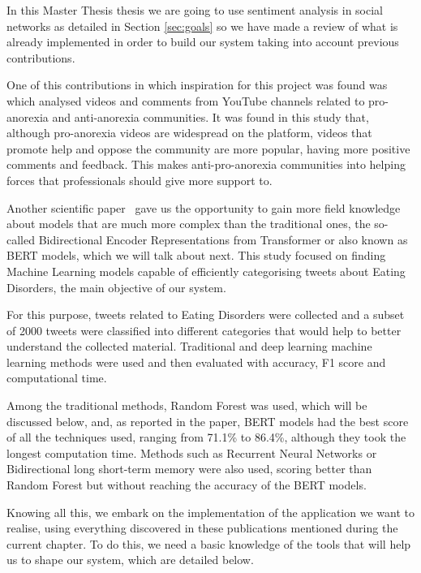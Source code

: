 
In this Master Thesis thesis we are going to use sentiment analysis in social networks as detailed in Section \ref{sec:goals} so we have made a review of what is already implemented in order to build our system taking into account previous contributions.

One of this contributions in which inspiration for this project was found was~\cite{oksanen2015pro} which analysed videos and comments from YouTube channels related to pro-anorexia and anti-anorexia communities. It was found in this study that, although pro-anorexia videos are widespread on the platform, videos that promote help and oppose the community are more popular, having more positive comments and feedback. This makes anti-pro-anorexia communities into helping forces that professionals should give more support to.

Another scientific paper~\cite{benitez2022traditional} gave us the opportunity to gain more field knowledge about models that are much more complex than the traditional ones, the so-called Bidirectional Encoder Representations from Transformer or also known as BERT models, which we will talk about next. This study focused on finding Machine Learning models capable of efficiently categorising tweets about Eating Disorders, the main objective of our system.

For this purpose, tweets related to Eating Disorders were collected and a subset of 2000 tweets were classified into different categories that would help to better understand the collected material. Traditional and deep learning machine learning methods were used and then evaluated with accuracy, F1 score and computational time. 

Among the traditional methods, Random Forest was used, which will be discussed below, and, as reported in the paper, BERT models had the best score of all the techniques used, ranging from 71.1\% to 86.4\%, although they took the longest computation time. Methods such as Recurrent Neural Networks or Bidirectional long short-term memory were also used, scoring better than Random Forest but without reaching the accuracy of the BERT models.



Knowing all this, we embark on the implementation of the application we want to realise, using everything discovered in these publications mentioned during the current chapter. To do this, we need a basic knowledge of the tools that will help us to shape our system, which are detailed below. 


